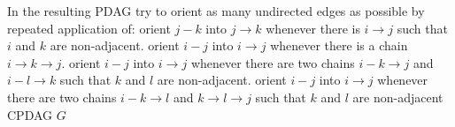 \begin{algorithm}[H]
\DontPrintSemicolon
{}

\caption{\protect{}}
In the resulting PDAG try to orient as many undirected edges as possible by repeated application of:\;
\RA orient $j-k$ into $j\rightarrow k$ whenever there is $i\rightarrow j$ such that $i$ and $k$ are non-adjacent.\;
\RB orient $i-j$ into $i\rightarrow j$ whenever there is a chain $i\rightarrow k\rightarrow j$.\;
\RC orient $i-j$ into $i\rightarrow j$ whenever there are two chains $i-k\rightarrow j$ and $i-l\rightarrow k$ such that $k$ and $l$ are non-adjacent.\;
\RD orient $i-j$ into $i\rightarrow j$ whenever there are two chains $i-k\rightarrow l$ and $k\rightarrow l\rightarrow j$ such that $k$ and $l$ are non-adjacent\;
\Return CPDAG $G$\;


\end{algorithm}
